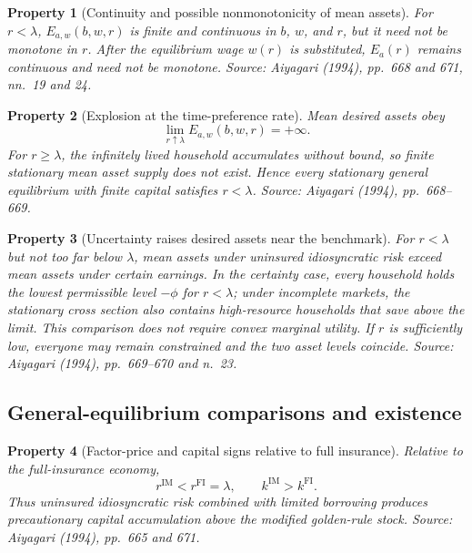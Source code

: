 \documentclass[11pt]{article}
\theoremstyle{propertystyle}
\newtheorem{property}{Property}
\newcommand{\1}{\mathbf{1}}
\begin{document}
\begin{property}[Continuity and possible nonmonotonicity of mean assets]
For $r<\lambda$, $E_{a,w}(b,w,r)$ is finite and continuous in $b$, $w$, and
$r$, but it need not be monotone in $r$.  After the equilibrium wage $w(r)$ is
substituted, $E_a(r)$ remains continuous and need not be monotone.
\emph{Source: Aiyagari (1994), pp.~668 and 671, nn.~19 and 24.}
\end{property}

\begin{property}[Explosion at the time-preference rate]
Mean desired assets obey
\[
  \lim_{r\uparrow\lambda}E_{a,w}(b,w,r)=+\infty.
\]
For $r\geq\lambda$, the infinitely lived household accumulates without bound,
so finite stationary mean asset supply does not exist.  Hence every stationary
general equilibrium with finite capital satisfies $r<\lambda$.
\emph{Source: Aiyagari (1994), pp.~668--669.}
\end{property}

\begin{property}[Uncertainty raises desired assets near the benchmark]
For $r<\lambda$ but not too far below $\lambda$, mean assets under uninsured
idiosyncratic risk exceed mean assets under certain earnings.  In the certainty
case, every household holds the lowest permissible level $-\phi$ for
$r<\lambda$; under incomplete markets, the stationary cross section also
contains high-resource households that save above the limit.  This comparison
does not require convex marginal utility.  If $r$ is sufficiently low,
everyone may remain constrained and the two asset levels coincide.
\emph{Source: Aiyagari (1994), pp.~669--670 and n.~23.}
\end{property}

\subsection{General-equilibrium comparisons and existence}

\begin{property}[Factor-price and capital signs relative to full insurance]
Relative to the full-insurance economy,
\[
  r^{\mathrm{IM}}<r^{\mathrm{FI}}=\lambda,
  \qquad
  k^{\mathrm{IM}}>k^{\mathrm{FI}}.
\]
Thus uninsured idiosyncratic risk combined with limited borrowing produces
precautionary capital accumulation above the modified golden-rule stock.
\emph{Source: Aiyagari (1994), pp.~665 and 671.}
\end{property}
\end{document}
